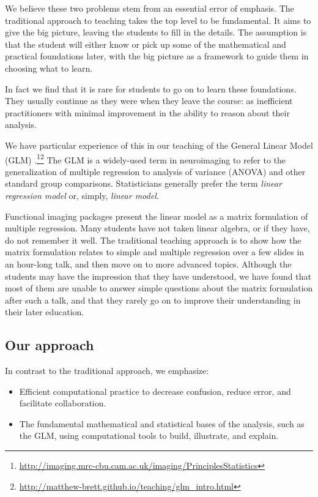 We believe these two problems stem from an essential error of emphasis.  The
traditional approach to teaching takes the top level to be fundamental.  It
aims to give the big picture, leaving the students to fill in the details.
The assumption is that the student will either know or pick up some of the
mathematical and practical foundations later, with the big picture as a
framework to guide them in choosing what to learn.

In fact we find that it is rare for students to go on to learn these
foundations. They usually continue as they were when they leave the course:
as inefficient practitioners with minimal improvement in the ability to reason
about their analysis.

We have particular experience of this in our teaching of the General Linear
Model (GLM)
\citep{poline2012general}.\footnote{\url{http://imaging.mrc-cbu.cam.ac.uk/imaging/PrinciplesStatistics}}\footnote{\url{http://matthew-brett.github.io/teaching/glm_intro.html}\label{glm_intro}}
The GLM is a widely-used term in neuroimaging to refer to the generalization
of multiple regression to analysis of variance (ANOVA) and other standard
group comparisons.  Statisticians generally prefer the term \emph{linear
regression model} or, simply, \emph{linear model}.

Functional imaging packages present the linear model as a matrix formulation
of multiple regression.  Many students have not taken linear algebra, or if
they have, do not remember it well.  The traditional teaching approach is to
show how the matrix formulation relates to simple and multiple regression over
a few slides in an hour-long talk, and then move on to more advanced topics.
Although the students may have the impression that they have understood, we
have found that most of them are unable to answer simple questions about the
matrix formulation after such a talk, and that they rarely go on to improve
their understanding in their later education.


\subsection{Our approach}

In contrast to the traditional approach, we emphasize:

\begin{itemize}

\item
    Efficient computational practice to decrease confusion, reduce error, and
        facilitate collaboration.

\item
    The fundamental mathematical and statistical bases of the
        analysis, such as the GLM, using computational tools to build,
        illustrate, and explain.

\end{itemize}

